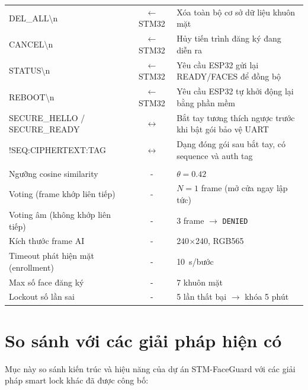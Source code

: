 \begin{table}[htbp]
\begin{tabularx}{\textwidth}{>{\ttfamily\raggedright\arraybackslash}p{4.9cm} c Y}
    DEL\_ALL\textbackslash n               & $\leftarrow$ STM32 & Xóa toàn bộ cơ sở dữ liệu khuôn mặt \\
    CANCEL\textbackslash n                 & $\leftarrow$ STM32 & Hủy tiến trình đăng ký đang diễn ra \\
    STATUS\textbackslash n                 & $\leftarrow$ STM32 & Yêu cầu ESP32 gửi lại READY/FACES để đồng bộ \\
    REBOOT\textbackslash n                 & $\leftarrow$ STM32 & Yêu cầu ESP32 tự khởi động lại bằng phần mềm \\
    SECURE\_HELLO / SECURE\_READY          & $\leftrightarrow$ & Bắt tay tương thích ngược trước khi bật gói bảo vệ UART \\
    !SEQ:CIPHERTEXT:TAG                    & $\leftrightarrow$ & Dạng đóng gói sau bắt tay, có sequence và auth tag \\
    \midrule
     \\
    Ngưỡng cosine similarity              &  - & $\theta = 0.42$ \\
    Voting (frame khớp liên tiếp)         &  - & $N = 1$ frame (mở cửa ngay lập tức) \\
    Voting âm (không khớp liên tiếp)      &  - & 3 frame $\to$ \texttt{DENIED} \\
    Kích thước frame AI                   &  - & 240$\times$240, RGB565 \\
    Timeout phát hiện mặt (enrollment)    &  - & \SI{10}{s}/bước \\
    Max số face đăng ký                   &  - & 7 khuôn mặt \\
    Lockout số lần sai                    &  - & 5 lần thất bại $\to$ khóa 5 phút \\
    \bottomrule
  \end{tabularx}
\end{table}

\section{So sánh với các giải pháp hiện có}
\label{sec:related_work}

Mục này so sánh kiến trúc và hiệu năng của dự án STM-FaceGuard với các giải pháp smart lock khác đã được công bố:


